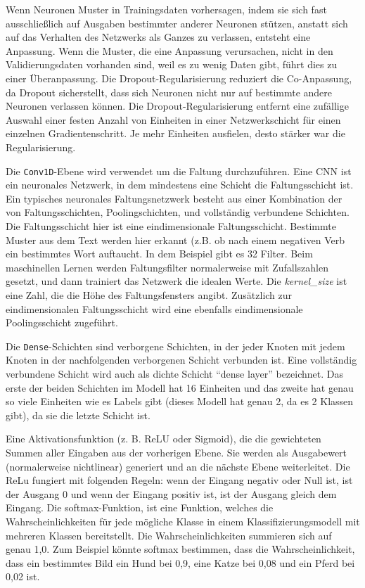 Wenn Neuronen Muster in Trainingsdaten vorhersagen, indem sie sich fast ausschließlich auf Ausgaben bestimmter anderer Neuronen stützen, anstatt sich auf das Verhalten des Netzwerks als Ganzes zu verlassen, entsteht eine Anpassung. Wenn die Muster, die eine Anpassung verursachen, nicht in den Validierungsdaten vorhanden sind, weil es zu wenig Daten gibt, führt dies zu einer Überanpassung. Die Dropout-Regularisierung reduziert die Co-Anpassung, da Dropout sicherstellt, dass sich Neuronen nicht nur auf bestimmte andere Neuronen verlassen können. Die Dropout-Regularisierung entfernt eine zufällige Auswahl einer festen Anzahl von Einheiten in einer Netzwerkschicht für einen einzelnen Gradientenschritt. Je mehr Einheiten ausfielen, desto stärker war die Regularisierung. 



Die \texttt{Conv1D}-Ebene wird verwendet um die Faltung durchzuführen. Eine CNN ist ein neuronales Netzwerk, in dem mindestens eine Schicht die Faltungsschicht ist. Ein typisches neuronales Faltungsnetzwerk besteht aus einer Kombination der von Faltungsschichten, Poolingschichten, und vollständig verbundene Schichten. Die Faltungsschicht hier ist eine eindimensionale Faltungsschicht. Bestimmte Muster aus dem Text werden hier erkannt (z.B. ob nach einem negativen Verb ein bestimmtes Wort auftaucht. In dem Beispiel gibt es 32 Filter. Beim maschinellen Lernen werden Faltungsfilter normalerweise mit Zufallszahlen gesetzt, und dann trainiert das Netzwerk die idealen Werte. Die \textit{kernel\_size} ist eine Zahl, die die Höhe des Faltungsfensters angibt. Zusätzlich zur eindimensionalen Faltungsschicht wird eine ebenfalls eindimensionale Poolingsschicht zugeführt.


Die \texttt{Dense}-Schichten sind verborgene Schichten, in der jeder Knoten mit jedem Knoten in der nachfolgenden verborgenen Schicht verbunden ist. Eine vollständig verbundene Schicht wird auch als dichte Schicht \enquote{dense layer} bezeichnet. Das erste der beiden Schichten im Modell hat 16 Einheiten und das zweite hat genau so viele Einheiten wie es Labels gibt (dieses Modell hat genau 2, da es 2 Klassen gibt), da sie die letzte Schicht ist.

Eine Aktivationsfunktion (z. B. ReLU oder Sigmoid), die die gewichteten Summen aller Eingaben aus der vorherigen Ebene. Sie werden als Ausgabewert (normalerweise nichtlinear) generiert und an die nächste Ebene weiterleitet. Die ReLu fungiert mit folgenden Regeln: wenn der Eingang negativ oder Null ist, ist der Ausgang 0 und wenn der Eingang positiv ist, ist der Ausgang gleich dem Eingang. Die softmax-Funktion, ist eine Funktion, welches die Wahrscheinlichkeiten für jede mögliche Klasse in einem Klassifizierungsmodell mit mehreren Klassen bereitstellt. Die Wahrscheinlichkeiten summieren sich auf genau 1,0. Zum Beispiel könnte softmax bestimmen, dass die Wahrscheinlichkeit, dass ein bestimmtes Bild ein Hund bei 0,9, eine Katze bei 0,08 und ein Pferd bei 0,02 ist.

